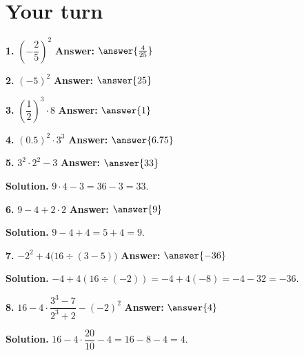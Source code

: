 \documentclass{ximera}
\begin{document}
\section*{Your turn}

\begin{problem}
\textbf{1.} $\left(-\dfrac{2}{5}\right)^{2}$ \qquad \textbf{Answer:} $\answer{\frac{4}{25}}$
\end{problem}

\begin{problem}
\textbf{2.} $(-5)^{2}$ \qquad \textbf{Answer:} $\answer{25}$
\end{problem}

\begin{problem}
\textbf{3.} $\left(\dfrac{1}{2}\right)^{3} \cdot 8$ \qquad \textbf{Answer:} $\answer{1}$
\end{problem}

\begin{problem}
\textbf{4.} $(0.5)^{2} \cdot 3^{3}$ \qquad \textbf{Answer:} $\answer{6.75}$
\end{problem}

\begin{problem}
\textbf{5.} $3^{2} \cdot 2^{2}-3$ \qquad \textbf{Answer:} $\answer{33}$

\begin{hint}
\textbf{Solution.} $9\cdot 4-3=36-3=33$.
\end{hint}
\end{problem}

\begin{problem}
\textbf{6.} $9-4+2 \cdot 2$ \qquad \textbf{Answer:} $\answer{9}$

\begin{hint}
\textbf{Solution.} $9-4+4=5+4=9$.
\end{hint}
\end{problem}

\begin{problem}
\textbf{7.} $-2^{2}+4\bigl(16 \div (3-5)\bigr)$ \qquad \textbf{Answer:} $\answer{-36}$

\begin{hint}
\textbf{Solution.} $-4+4(16 \div (-2)) = -4+4(-8) = -4-32 = -36$.
\end{hint}
\end{problem}

\begin{problem}
\textbf{8.} $16-4 \cdot \dfrac{3^{3}-7}{2^{3}+2}-(-2)^{2}$ \qquad
\textbf{Answer:} $\answer{4}$

\begin{hint}
\textbf{Solution.} $16-4\cdot\dfrac{20}{10}-4 = 16-8-4 = 4$.
\end{hint}
\end{problem}
\end{document}
